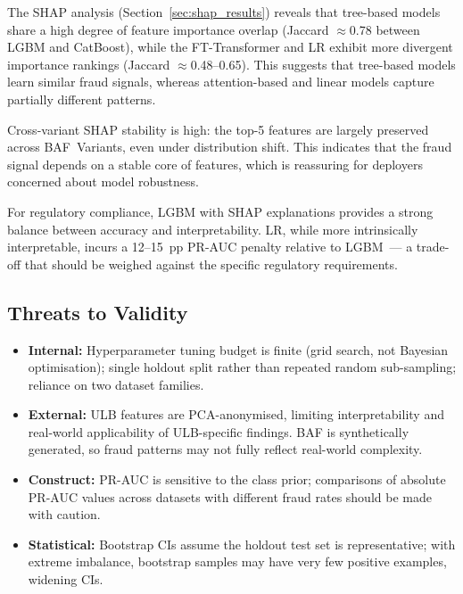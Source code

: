 The SHAP analysis (Section~\ref{sec:shap_results}) reveals that
tree-based models share a high degree of feature importance overlap
(Jaccard $\approx$0.78 between LGBM and CatBoost), while the
FT-Transformer and LR exhibit more divergent importance rankings
(Jaccard $\approx$0.48--0.65).
This suggests that tree-based models learn similar fraud signals,
whereas attention-based and linear models capture partially different
patterns.

Cross-variant SHAP stability is high: the top-5 features are largely
preserved across BAF~Variants, even under distribution shift.
This indicates that the fraud signal depends on a stable core of features,
which is reassuring for deployers concerned about model robustness.

For regulatory compliance, LGBM with SHAP explanations provides a strong
balance between accuracy and interpretability.
LR, while more intrinsically interpretable, incurs a 12--15~pp PR-AUC
penalty relative to LGBM~--- a trade-off that should be weighed against
the specific regulatory requirements.

\subsection{Threats to Validity}
\begin{itemize}
  \item \textbf{Internal:} Hyperparameter tuning budget is finite
    (grid search, not Bayesian optimisation); single holdout split rather
    than repeated random sub-sampling; reliance on two dataset families.
  \item \textbf{External:} ULB features are PCA-anonymised, limiting
    interpretability and real-world applicability of ULB-specific findings.
    BAF is synthetically generated, so fraud patterns may not fully
    reflect real-world complexity.
  \item \textbf{Construct:} PR-AUC is sensitive to the class prior;
    comparisons of absolute PR-AUC values across datasets with different
    fraud rates should be made with caution.
  \item \textbf{Statistical:} Bootstrap CIs assume the holdout test set
    is representative; with extreme imbalance, bootstrap samples may
    have very few positive examples, widening CIs.
\end{itemize}
